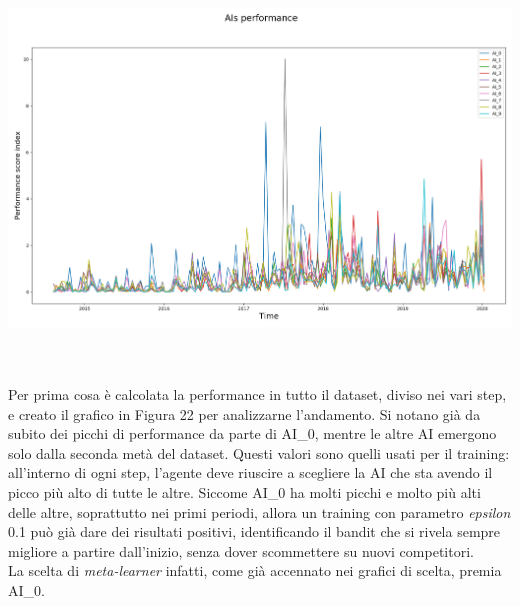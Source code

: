 \documentclass[a4paper,12pt]{report}
\begin{document}
\begin{fig}
\begin{fig}
	\begin{center}
		\includegraphics[width=\linewidth]{performance_ai_250}
	\end{center}
	\label{Figura 19}
\end{fig}
\\~\\Per prima cosa è calcolata la performance in tutto il dataset, diviso nei vari step, e creato il grafico in Figura 22 per analizzarne l'andamento. Si notano già da subito dei picchi di performance da parte di AI\_0, mentre le altre AI emergono solo dalla seconda metà del dataset. Questi valori sono quelli usati per il training: all'interno di ogni step, l'agente deve riuscire a scegliere la AI che sta avendo il picco più alto di tutte le altre. Siccome AI\_0 ha molti picchi e molto più alti delle altre, soprattutto nei primi periodi, allora un training con parametro \textit{epsilon} 0.1 può già dare dei risultati positivi, identificando il bandit che si rivela sempre migliore a partire dall'inizio, senza dover scommettere su nuovi competitori.\\ La scelta di \textit{meta-learner} infatti, come già accennato nei grafici di scelta, premia AI\_0.

\end{fig}
\end{document}
